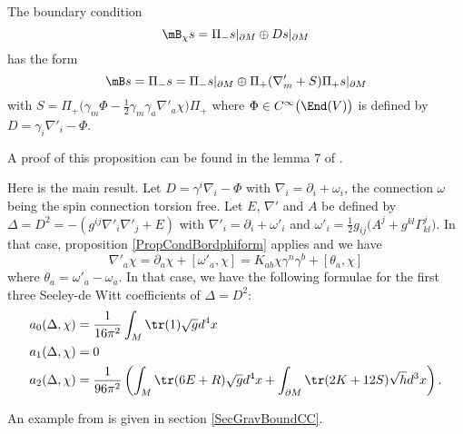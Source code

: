 \begin{proposition}		\label{PropCondBordphiform}
The boundary condition 
\[ 
  \mB_{\chi}s=\Pi_-s|_{\partial M}\oplus Ds|_{\partial M}
\]
has the form
\[ 
  \mB s=\Pi_-s=\Pi_-s|_{\partial M}\oplus\Pi_+(\nabla'_m+S)\Pi_+s|_{\partial M}
\]
with $S=\Pi_+\big( \gamma_m\Phi-\frac{ 1 }{2}\gamma_m\gamma_a\nabla'_a\chi \big)\Pi_+$ where $\Phi\in C^{\infty}\big( \End(V) \big)$ is defined by $D=\gamma_i\nabla'_i-\Phi$.
\end{proposition}
A proof of this proposition can be found in the lemma 7 of \cite{ResEtaDiracTypeBoundary}.

Here is the main result. Let $D=\gamma^i\nabla_i-\Phi$ with $\nabla_i=\partial_i+\omega_i$, the connection $\omega$ being the spin connection torsion free. Let $E$, $\nabla'$ and $A$ be defined by $\Delta=D^2=-(g^{ij}\nabla'_i\nabla'_j+E)$ with $\nabla'_i=\partial_i+\omega'_i$ and $\omega'_i=\frac{ 1 }{2}g_{ij}\big( A^j+g^{kl}\Gamma^j_{kl} \big)$. In that case, proposition \ref{PropCondBordphiform} applies and we have
\[ 
  \nabla'_a\chi=\partial_a\chi+[\omega'_a,\chi]=K_{ab}\chi\gamma^n\gamma^b+[\theta_a,\chi]
\]
where $\theta_a=\omega'_a-\omega_a$. In that case, we have the following formulae for the first three Seeley-de Witt coefficients of $\Delta=D^2$:
\begin{equation}		\label{EqSeeyleydeWitt}
\begin{split}
a_0(\Delta,\chi)	&=\frac{1}{ 16\pi^2 }\int_M\tr(1)\sqrt{g}d^4x\\
a_1(\Delta,\chi)	&=0\\
a_2(\Delta,\chi)	&=\frac{1}{ 96\pi^2 }\left( \int_M \tr(6E+R)\sqrt{g}d^4x+\int_{\partial M}\tr(2K+12S)\sqrt{h}d^3x   \right).
\end{split}
\end{equation}

An example from \cite{QGBoundaryTermsSpectralAction} is given in section \ref{SecGravBoundCC}.

